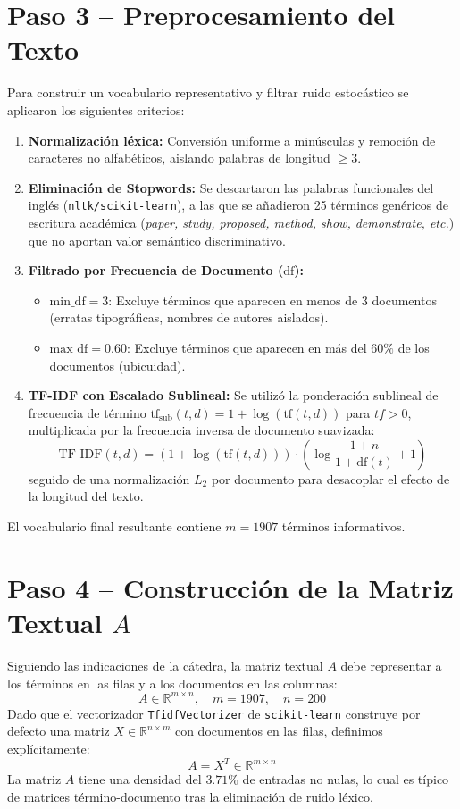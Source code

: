 \documentclass[11pt,a4paper]{article}
\begin{document}
\section{Paso 3 -- Preprocesamiento del Texto}
Para construir un vocabulario representativo y filtrar ruido estocástico se aplicaron los siguientes criterios:
\begin{enumerate}
    \item \textbf{Normalización léxica:} Conversión uniforme a minúsculas y remoción de caracteres no alfabéticos, aislando palabras de longitud $\ge 3$.
    \item \textbf{Eliminación de Stopwords:} Se descartaron las palabras funcionales del inglés (\texttt{nltk/scikit-learn}), a las que se añadieron 25 términos genéricos de escritura académica (\textit{paper, study, proposed, method, show, demonstrate, etc.}) que no aportan valor semántico discriminativo.
    \item \textbf{Filtrado por Frecuencia de Documento ($\text{df}$):}
    \begin{itemize}
        \item $\text{min\_df} = 3$: Excluye términos que aparecen en menos de 3 documentos (erratas tipográficas, nombres de autores aislados).
        \item $\text{max\_df} = 0.60$: Excluye términos que aparecen en más del $60\%$ de los documentos (ubicuidad).
    \end{itemize}
    \item \textbf{TF-IDF con Escalado Sublineal:} Se utilizó la ponderación sublineal de frecuencia de término $\text{tf}_{\text{sub}}(t, d) = 1 + \log(\text{tf}(t, d))$ para $tf > 0$, multiplicada por la frecuencia inversa de documento suavizada:
    \begin{equation}
        \text{TF-IDF}(t, d) = (1 + \log(\text{tf}(t, d))) \cdot \left( \log \frac{1 + n}{1 + \text{df}(t)} + 1 \right)
    \end{equation}
    seguido de una normalización $L_2$ por documento para desacoplar el efecto de la longitud del texto.
\end{enumerate}
El vocabulario final resultante contiene $m = 1907$ términos informativos.

\section{Paso 4 -- Construcción de la Matriz Textual $A$}
Siguiendo las indicaciones de la cátedra, la matriz textual $A$ debe representar a los términos en las filas y a los documentos en las columnas:
\begin{equation}
    A \in \mathbb{R}^{m \times n}, \quad m = 1907, \quad n = 200
\end{equation}
Dado que el vectorizador \texttt{TfidfVectorizer} de \texttt{scikit-learn} construye por defecto una matriz $X \in \mathbb{R}^{n \times m}$ con documentos en las filas, definimos explícitamente:
\begin{equation}
    A = X^T \in \mathbb{R}^{m \times n}
\end{equation}
La matriz $A$ tiene una densidad del $3.71\%$ de entradas no nulas, lo cual es típico de matrices término-documento tras la eliminación de ruido léxico.
\end{document}
